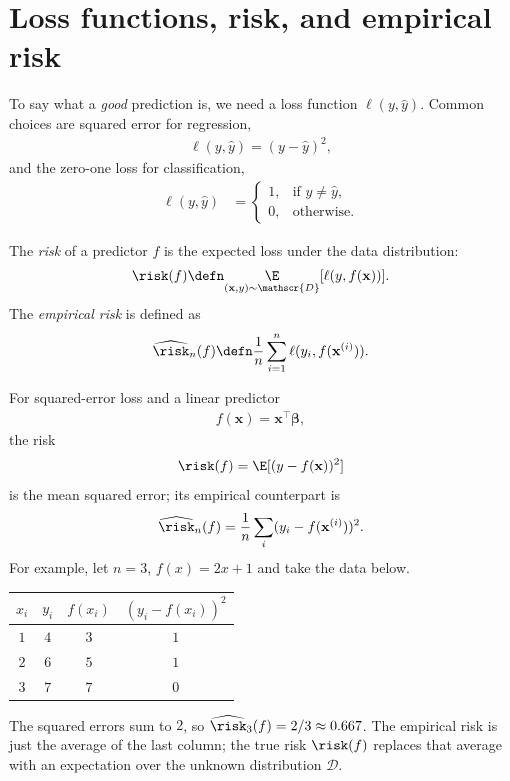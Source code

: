 \documentclass[a4paper, 12pt]{book}
\begin{document}
\section{Loss functions, risk, and empirical risk}

To say what a \emph{good} prediction is, we need a loss function $\ell(y,\hat{y})$. Common choices are squared error for regression, 
\begin{align}
    \ell(y,\hat{y})=(y-\hat{y})^2,
\end{align}
and the zero-one loss for classification, 
\begin{align}
    \ell(y,\hat{y})&=\begin{cases}
        1, &\text{if $y \neq \hat{y}$},\\
        0, &\text{otherwise}.
    \end{cases}
\end{align}
\begin{definition}
The \emph{risk} of a predictor $f$ is the expected loss under the data distribution:
\begin{align}
    \risk(f) \defn \underset{(\mathbf{x},y)\sim\mathscr{D}}{\E}[\ell(y,f(\mathbf{x}))].
\end{align}
The \emph{empirical risk} is defined as 
\begin{align}
    \widehat{\risk}_n(f) \defn \frac{1}{n}\sum_{i=1}^n \ell(y_i, f(\mathbf{x}^{(i)})).
\end{align}
\end{definition}
\begin{example}
    For squared-error loss and a linear predictor 
    \begin{align}
        f(\mathbf{x})=\mathbf{x}^\top\boldsymbol{\beta},
    \end{align}
    the risk 
    \begin{align}
        \risk(f)=\E[(y-f(\mathbf{x}))^2]
    \end{align}
    is the mean squared error; its empirical counterpart is 
    \begin{align}
        \widehat\risk_n(f)=\frac1n\sum_i(y_i-f(\mathbf{x}^{(i)}))^2.
    \end{align}
    For example, let $n=3$, $f(x)=2x+1$ and take the data below.
    \begin{center}
    \begin{tabular}{@{}cccc@{}}
        \toprule
        $x_i$ & $y_i$ & $f(x_i)$ & $(y_i-f(x_i))^2$ \\
        \midrule
        $1$ & $4$ & $3$ & $1$ \\
        $2$ & $6$ & $5$ & $1$ \\
        $3$ & $7$ & $7$ & $0$ \\
        \bottomrule
    \end{tabular}
    \end{center}
    The squared errors sum to $2$, so
    $\widehat\risk_3(f)=2/3\approx0.667$. The empirical risk is just the
    average of the last column; the true risk $\risk(f)$ replaces that average
    with an expectation over the unknown distribution $\mathscr{D}$.
\end{example}
\end{document}
